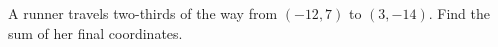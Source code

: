 A runner travels two-thirds of the way from $(-12,7)$ to $(3,-14)$. Find the sum of her final coordinates.

